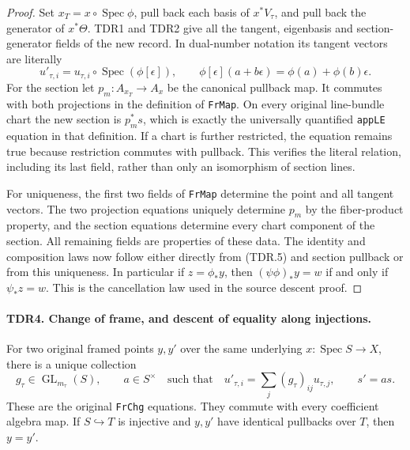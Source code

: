 \begin{proof}
Set \(x_T=x\circ\operatorname{Spec}\phi\), pull back each
basis of \(x^*V_\tau\), and pull back the generator of
\(x^*\Theta\).  TDR1 and TDR2 give all the tangent, eigenbasis
and section-generator fields of the new record.  In dual-number
notation its tangent vectors are literally
\[
 u'_{\tau,i}
   =u_{\tau,i}\circ\operatorname{Spec}(\phi[\epsilon]),
 \qquad
 \phi[\epsilon](a+b\epsilon)=\phi(a)+\phi(b)\epsilon .       \tag{TDR.5}
\]
For the section let \(p_m:A_{x_T}\to A_x\) be the canonical
pullback map.  It commutes with both projections in the definition
of \texttt{FrMap}.  On every original line-bundle chart the new
section is \(p_m^*s\), which is exactly the universally quantified
\texttt{appLE} equation in that definition.  If a chart is further
restricted, the equation remains true because restriction commutes
with pullback.  This verifies the literal relation, including its
last field, rather than only an isomorphism of section lines.

For uniqueness, the first two fields of \texttt{FrMap} determine
the point and all tangent vectors.  The two projection equations
uniquely determine \(p_m\) by the fiber-product property, and the
section equations determine every chart component of the section.
All remaining fields are properties of these data.  The identity
and composition laws now follow either directly from (TDR.5) and
section pullback or from this uniqueness.  In particular if
\(z=\phi_*y\), then \((\psi\phi)_*y=w\) if and only if
\(\psi_*z=w\).  This is the cancellation law used in the source
descent proof.
\end{proof}

\paragraph{TDR4. Change of frame, and descent of equality along injections.}
\label{claim:TDR4}
For two original framed points \(y,y'\) over the same underlying
\(x:\operatorname{Spec}S\to X\), there is a unique collection
\[
 g_\tau\in\operatorname{GL}_{m_\tau}(S),\qquad a\in S^\times
 \quad\text{such that}\quad
 u'_{\tau,i}=\sum_j(g_\tau)_{ij}u_{\tau,j},\qquad s'=a s.
                                                               \tag{TDR.6}
\]
These are the original \texttt{FrChg} equations.  They commute
with every coefficient algebra map.  If \(S\hookrightarrow T\)
is injective and \(y,y'\) have identical pullbacks over \(T\),
then \(y=y'\).

